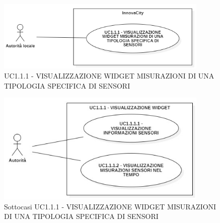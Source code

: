 







\begin{figure}[H]
    \centering
    \includegraphics[width=0.9\textwidth]{../Images/uc1.1.1.png}
    \caption{UC1.1.1 - VISUALIZZAZIONE WIDGET MISURAZIONI DI UNA TIPOLOGIA SPECIFICA DI SENSORI}
    \label{fig:UC3}
\end{figure}





\begin{figure}[H]
    \centering
    \includegraphics[width=0.9\textwidth]{../Images/subUC1.1.1.jpg}
    \caption{Sottocasi UC1.1.1 - VISUALIZZAZIONE WIDGET MISURAZIONI DI UNA TIPOLOGIA SPECIFICA DI SENSORI}
    \label{fig:UC3_sub}
\end{figure}

